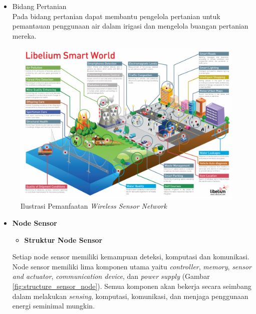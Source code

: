 \documentclass[a4paper,twoside]{article}
\begin{document}
\begin{enumerate}
\begin{itemize}
\begin{itemize}
\item Bidang Pertanian\\
Pada bidang pertanian dapat membantu pengelola pertanian untuk pemantauan penggunaan air dalam irigasi dan mengelola buangan pertanian mereka.
\end{itemize}
		\end{itemize}
\begin{figure} [H]
	\centering  
	\includegraphics[scale=0.3]{Gambar/smartworld}  
	\caption[Ilustrasi Pemanfaatan \textit{Wireless Sensor Network}]{Ilustrasi Pemanfaatan \textit{Wireless Sensor Network}} 
	\label{fig:smartworld} 
\end{figure} 

		\begin{itemize}
		\item \textbf{Node Sensor}
\begin{itemize}
\item \textbf{Struktur Node Sensor}
\end{itemize}
Setiap node sensor memiliki kemampuan deteksi, komputasi dan komunikasi. Node sensor memiliki lima komponen utama yaitu \textit{controller}, \textit{memory}, \textit{sensor and actuator}, \textit{communication device}, dan \textit{power supply} (Gambar \ref{fig:structure_sensor_node}). Semua komponen akan bekerja secara seimbang dalam melakukan \textit{sensing}, komputasi, komunikasi, dan menjaga penggunaan energi seminimal mungkin. 


\end{itemize}
\end{enumerate}
\end{document}
